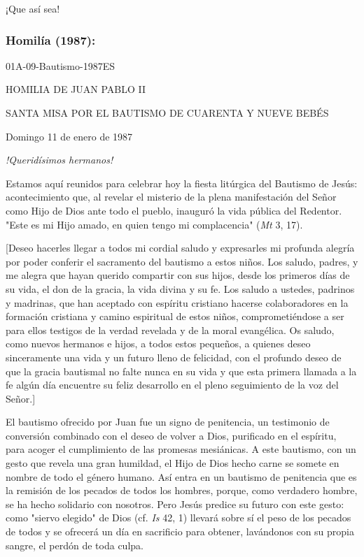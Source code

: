 ¡Que así sea!

\subsubsection{Homilía (1987): }
01A-09-Bautismo-1987ES

HOMILIA DE JUAN PABLO II

SANTA MISA POR EL BAUTISMO DE CUARENTA Y NUEVE BEBÉS

Domingo 11 de enero de 1987

\emph{!Queridísimos hermanos!}

Estamos aquí reunidos para celebrar hoy la fiesta litúrgica del Bautismo
de Jesús: acontecimiento que, al revelar el misterio de la plena
manifestación del Señor como Hijo de Dios ante todo el pueblo, inauguró
la vida pública del Redentor. "Este es mi Hijo amado, en quien tengo mi
complacencia" (\emph{Mt} 3, 17).

{[}Deseo hacerles llegar a todos mi cordial saludo y expresarles mi
profunda alegría por poder conferir el sacramento del bautismo a estos
niños. Los saludo, padres, y me alegra que hayan querido compartir con
sus hijos, desde los primeros días de su vida, el don de la gracia, la
vida divina y su fe. Los saludo a ustedes, padrinos y madrinas, que han
aceptado con espíritu cristiano hacerse colaboradores en la formación
cristiana y camino espiritual de estos niños, comprometiéndose a ser
para ellos testigos de la verdad revelada y de la moral evangélica. Os
saludo, como nuevos hermanos e hijos, a todos estos pequeños, a quienes
deseo sinceramente una vida y un futuro lleno de felicidad, con el
profundo deseo de que la gracia bautismal no falte nunca en su vida y
que esta primera llamada a la fe algún día encuentre su feliz desarrollo
en el pleno seguimiento de la voz del Señor.{]}

El bautismo ofrecido por Juan fue un signo de penitencia, un testimonio
de conversión combinado con el deseo de volver a Dios, purificado en el
espíritu, para acoger el cumplimiento de las promesas mesiánicas. A este
bautismo, con un gesto que revela una gran humildad, el Hijo de Dios
hecho carne se somete en nombre de todo el género humano. Así entra en
un bautismo de penitencia que es la remisión de los pecados de todos los
hombres, porque, como verdadero hombre, se ha hecho solidario con
nosotros. Pero Jesús predice su futuro con este gesto: como "siervo
elegido" de Dios (cf. \emph{Is} 42, 1) llevará sobre sí el peso de los
pecados de todos y se ofrecerá un día en sacrificio para obtener,
lavándonos con su propia sangre, el perdón de toda culpa.

